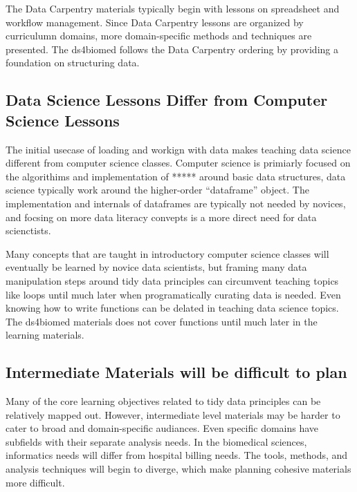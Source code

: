 \documentclass[020-persona_validation.tex]{subfiles}
\begin{document}
            The Data Carpentry materials typically begin with lessons on spreadsheet and workflow management.
            Since Data Carpentry lessons are organized by curriculumn domains,
            more domain-specific methods and techniques are presented.
            The ds4biomed follows the Data Carpentry ordering by providing a foundation on structuring data.

    \subsection{Data Science Lessons Differ from Computer Science Lessons}

        The initial usecase of loading and workign with data makes teaching data science different from computer science classes.
        Computer science is primiarly focused on the algorithims and implementation of ***** around basic data structures,
        data science typically work around the higher-order ``dataframe'' object.
        The implementation and internals of dataframes are typically not needed by novices,
        and focsing on more data literacy convepts is a more direct need for data scienctists.

        Many concepts that are taught in introductory computer science classes will eventually be learned by novice data scientists,
        but framing many data manipulation steps around tidy data principles can circumvent
        teaching topics like loops until much later when programatically curating data is needed.
        Even knowing how to write functions can be delated in teaching data science topics.
        The ds4biomed materials does not cover functions until much later in the learning materials.

    \subsection{Intermediate Materials will be difficult to plan}

        Many of the core learning objectives related to tidy data principles can be relatively mapped out.
        However, intermediate level materials may be harder to cater to broad and domain-specific audiances.
        Even specific domains have subfields with their separate analysis needs.
        In the biomedical sciences, informatics needs will differ from hospital billing needs.
        The tools, methods, and analysis techniques will begin to diverge, which make planning
        cohesive materials more difficult.
\end{document}
